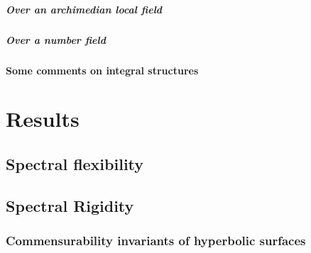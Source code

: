 \paragraph{Over an archimedian local field}

\paragraph{Over a number field}

\subsubsection{Some comments on integral structures}

\chapter{Results}
\section{Spectral flexibility}

\section{Spectral Rigidity}
\subsection{Commensurability invariants of hyperbolic surfaces}
